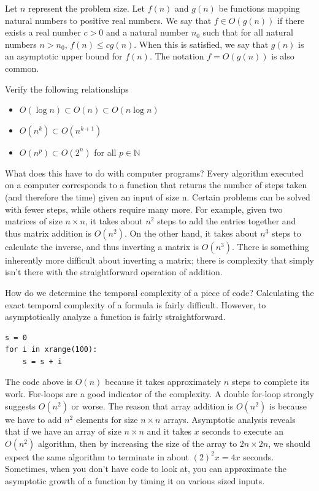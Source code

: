 \begin{definition}
Let $n$ represent the problem size.  Let $f(n)$ and $g(n)$ be functions mapping natural numbers to positive real numbers. We say that $f \in O(g(n))$ if there exists a real
number $c > 0$ and a natural number $n_0$ such that for all natural numbers $n > n_0$,
$f(n) \leq cg(n)$.
When this is satisfied, we say that $g(n)$ is an asymptotic upper bound for $f(n)$.
The notation $f = O(g(n))$ is also common.
\end{definition}

\begin{problem}
Verify the following relationships
\begin{itemize}
\item $O(\log{n}) \subset O(n) \subset O(n\log{n})$
\item $O(n^k) \subset O(n^{k+1})$
\item $O(n^p) \subset O(2^n)$ for all $p \in \mathbb{N}$
\end{itemize}
\end{problem}

What does this have to do with computer programs?
Every algorithm executed on a computer corresponds to a function
that returns the number of steps taken (and therefore the time)
given an input of size n.  Certain problems can be solved with fewer steps,
while others require many more.  For example, given two matrices of size $n \times n$,
it takes about $n^2$ steps to add the entries together and thus matrix addition is $O(n^2)$.
On the other hand, it takes about $n^3$ steps to calculate the inverse,
and thus inverting a matrix is $O(n^3)$.
There is something inherently more difficult about inverting a matrix;
there is complexity that simply isn't there with the straightforward operation of addition.

How do we determine the temporal complexity of a piece of code?
Calculating the exact temporal complexity of a formula is fairly difficult.
However, to asymptotically analyze a function is fairly straightforward.
\begin{lstlisting}
s = 0
for i in xrange(100):
    s = s + i
\end{lstlisting}
The code above is $O(n)$ because it takes approximately $n$ steps to complete its work.
For-loops are a good indicator of the complexity.  A double for-loop strongly suggests
$O(n^2)$ or worse.  The reason that array addition is $O(n^2)$ is because we have to add
$n^2$ elements for size $n \times n$ arrays.  Asymptotic analysis reveals that
if we have an array of size $n \times n$ and it takes $x$ seconds to execute an $O(n^2)$ algorithm,
then by increasing the size of the array to $2n \times 2n$, we should expect the same algorithm
to terminate in about $(2)^2 x = 4x$ seconds.  Sometimes, when you don't have code to look at,
you can approximate the asymptotic growth of a function by timing it on various sized inputs.

